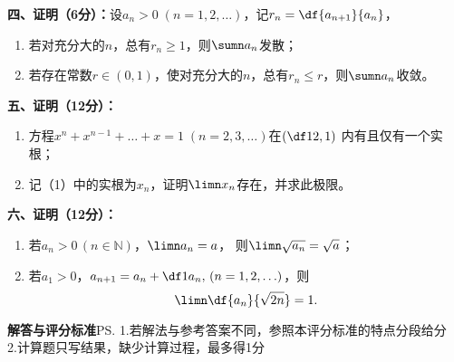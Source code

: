 {\bf 四、证明（6分）：}设$a_n>0\;(n=1,2,\ldots)$，记$r_n=\df{a_{n+1}}{a_n}$，
\begin{enumerate}[(1)]
  \setlength{\itemindent}{1cm}
  \item 若对充分大的$n$，总有$r_n\geq 1$，则$\sumn a_n$发散；
  \item 若存在常数$r\in(0,1)$，使对充分大的$n$，总有$r_n\leq r$，则$\sumn a_n$收敛。
\end{enumerate}

{\bf 五、证明（12分）：}
\begin{enumerate}[(1)]
  \setlength{\itemindent}{1cm}
  \item 方程$x^n+x^{n-1}+\ldots+x=1\;(n=2,3,\ldots)$在$\left(\df12,1\right)$
  内有且仅有一个实根；
  \item 记（1）中的实根为$x_n$，证明$\limn x_n$存在，并求此极限。
\end{enumerate}

% 

{\bf 六、证明（12分）：}
\begin{enumerate}[(1)]
  \setlength{\itemindent}{1cm}
  \item 若$a_n>0\,(n\in\mathbb{N})$，$\limn a_n=a$，
  则$\limn\sqrt{a_n}=\sqrt a$；
  \item 若$a_1>0$，$a_{n+1}=a_n+\df 1{a_n},\,(n=1,2,\ldots)$，则
  $$\limn\df{a_n}{\sqrt{2n}}=1.$$
\end{enumerate}

\newpage

\begin{center}
	{\Large\bf 解答与评分标准}\ps{1.若解法与参考答案不同，参照本评分标准的特点分段给分\\
	2.计算题只写结果，缺少计算过程，最多得1分}
\end{center}

